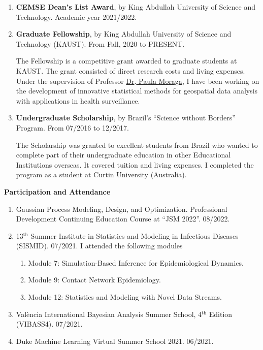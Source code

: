 \documentclass[11pt, ]{article}
\begin{document}
	\begin{enumerate}
		\item \textbf{CEMSE Dean's List Award}, by King Abdullah University of Science and Technology. Academic year 2021/2022.
		
		\item \textbf{Graduate Fellowship}, by King Abdullah University of Science and Technology (KAUST). From Fall, 2020 to PRESENT.
		
		The Fellowship is a competitive grant awarded to graduate students at KAUST. The grant consisted of direct research costs and living expenses. Under the supervision of Professor \href{https://www.paulamoraga.com/}{Dr$\text{.}$ Paula Moraga}, I have been working on the development of innovative statistical methods for geospatial data analysis with applications in health surveillance.
		
		\item \textbf{Undergraduate Scholarship}, by Brazil's ``Science without Borders'' Program. From 07/2016 to 12/2017.
		
		The Scholarship was granted to excellent students from Brazil who wanted to complete part of their undergraduate education in other Educational Institutions overseas. It covered tuition and living expenses. I completed the program as a student at Curtin University (Australia).
	
	\end{enumerate}
	
\vspace{6pt}

{\Large \textbf{Participation and Attendance}}

	\begin{enumerate}
		\item Gaussian Process Modeling, Design, and Optimization. Professional Development Continuing Education Course at ``JSM 2022''. 08/2022.
		
		\item 13${}^{\text{th}}$ Summer Institute in Statistics and Modeling in Infectious Diseases (SISMID). 07/2021. I attended the following modules \vspace{-6pt}
		\begin{enumerate}[label*=\arabic*., noitemsep]
			\item Module 7: Simulation-Based Inference for Epidemiological Dynamics.
			\item Module 9: Contact Network Epidemiology.
			\item Module 12: Statistics and Modeling with Novel Data Streams.
		\end{enumerate}
		
		\item València International Bayesian Analysis Summer School, 4${}^{\text{th}}$ Edition (VIBASS4). 07/2021.
		
		\item Duke Machine Learning Virtual Summer School 2021. 06/2021.
	\end{enumerate}
\end{document}
